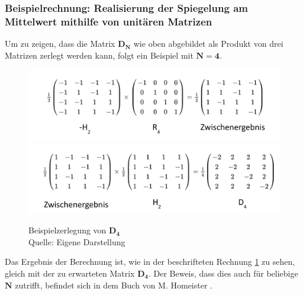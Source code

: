 \subsubsection{Beispielrechnung: Realisierung der Spiegelung am Mittelwert  mithilfe von unitären Matrizen}
Um zu zeigen, dass die Matrix $\mathbf{D_N}$ wie oben abgebildet als Produkt von drei Matrizen zerlegt werden kann, folgt ein Beispiel mit $\mathbf{N = 4}$.
\begin{figure}[hbtp]
	\centering
	\includegraphics[width=.8\textwidth]{figures/householderLokal_1.png}
	\includegraphics[width=.8\textwidth]{figures/householderLokal_2.png}
	\caption{Beispielzerlegung von $\mathbf{D_4}$ \\ Quelle: Eigene Darstellung}
	\label{fig:DLokal}
\end{figure}
Das Ergebnis der Berechnung ist, wie in der beschrifteten Rechnung \ref{fig:DLokal} zu sehen, gleich mit der zu erwarteten Matrix $\mathbf{D_4}$. Der Beweis, dass dies auch für beliebige $\mathbf{N}$ zutrifft, befindet sich in dem Buch von M. Homeister \cite[S. 309]{Homeister.2018}.

